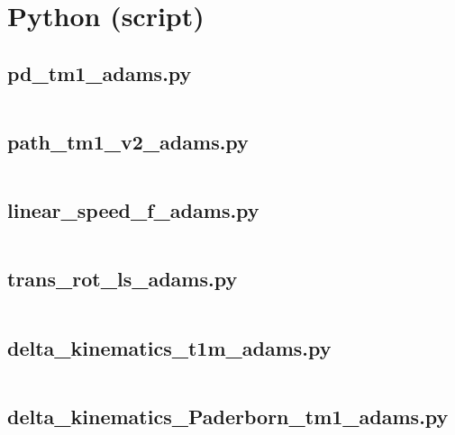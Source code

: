     
    
    \newpage
    
    \section{Python (script)}
    
        \subsection{pd\_tm1\_adams.py}
        {\footnotesize 
            \inputminted{python}{Back/codigos_py/pd_tm1_adams.py}
            }
        \newpage    
        
        \subsection{path\_tm1\_v2\_adams.py}
        {\footnotesize 
            \inputminted{python}{Back/codigos_py/path_tm1_v2_adams.py}
            }
        \newpage
        
        \subsection{linear\_speed\_f\_adams.py}
        {\footnotesize 
            \inputminted{python}{Back/codigos_py/linear_speed_f_adams.py}
            }
        \newpage
        
        \subsection{trans\_rot\_ls\_adams.py}
        {\footnotesize 
            \inputminted{python}{Back/codigos_py/trans_rot_ls_adams.py}
            }
        \newpage
        
        \subsection{delta\_kinematics\_t1m\_adams.py}
        {\footnotesize 
            \inputminted{python}{Back/codigos_py/delta_kinematics_t1m_adams.py}
            }
        \newpage
        
        \subsection{delta\_kinematics\_Paderborn\_tm1\_adams.py}
        {\footnotesize 
            \inputminted{python}{Back/codigos_py/delta_kinematics_Paderborn_tm1_adams.py}
            }
        \newpage
        

